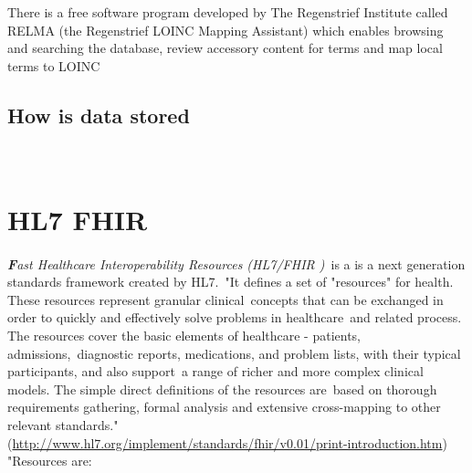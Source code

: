\documentclass[DIV=calc, paper=a4, fontsize=12pt, onecolumn]{scrartcl}	 %
\newcommand{\initial}[1]{ %
\lettrine[lines=3,lhang=0.3,nindent=0em,slope=0em]{
\color{DarkBlue}
{\textbf{\textit{#1}}}}{}}
\begin{document}
There is a free software program developed by The Regenstrief Institute called RELMA (the Regenstrief LOINC Mapping Assistant) which enables browsing and searching the database, review accessory content for terms and map local terms to LOINC \cite{kroth_using_2012} 

\subsection{How is data stored}\


\section[Fast Healthcare Interoperability Resources (HL7 FHIR\textsuperscript{\texttrademark})]
{HL7 FHIR \textsuperscript{\texttrademark}}
  \label{sec:fhir}

\initial{F}\textit{ast Healthcare Interoperability Resources (HL7/FHIR )}\
is a is a next generation standards framework created by HL7.\
"It defines a set of "resources" for health. These resources represent granular clinical\
concepts that can be exchanged in order to quickly and effectively solve problems in healthcare\
 and related process. The resources cover the basic elements of healthcare - patients, admissions,\
diagnostic reports, medications, and problem lists, with their typical participants, and also support\
a range of richer and more complex clinical models. The simple direct definitions of the resources are\
 based on thorough requirements gathering, formal analysis and extensive cross-mapping to other relevant standards."\\
  (\url{http://www.hl7.org/implement/standards/fhir/v0.01/print-introduction.htm})\\

"Resources are:\
\end{document}
